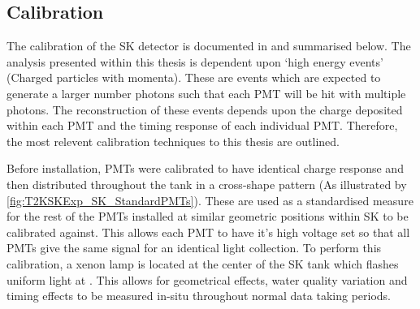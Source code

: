 \subsection{Calibration}
\label{subsec:T2KSKExp_SKCalibration}

The calibration of the SK detector is documented in \cite{Abe_2014_SKCalib} and summarised below. The analysis presented within this thesis is dependent upon `high energy events' (Charged particles with  momenta). These are events which are expected to generate a larger number photons such that each PMT will be hit with multiple photons. The reconstruction of these events depends upon the charge deposited within each PMT and the timing response of each individual PMT. Therefore, the most relevent calibration techniques to this thesis are outlined.

Before installation,  PMTs were calibrated to have identical charge response and then distributed throughout the tank in a cross-shape pattern (As illustrated by \autoref{fig:T2KSKExp_SK_StandardPMTs}). These are used as a standardised measure for the rest of the PMTs installed at similar geometric positions within SK to be calibrated against. This allows each PMT to have it's high voltage set so that all PMTs give the same signal for an identical light collection. To perform this calibration, a xenon lamp is located at the center of the SK tank which flashes uniform light at . This allows for geometrical effects, water quality variation and timing effects to be measured in-situ throughout normal data taking periods.

